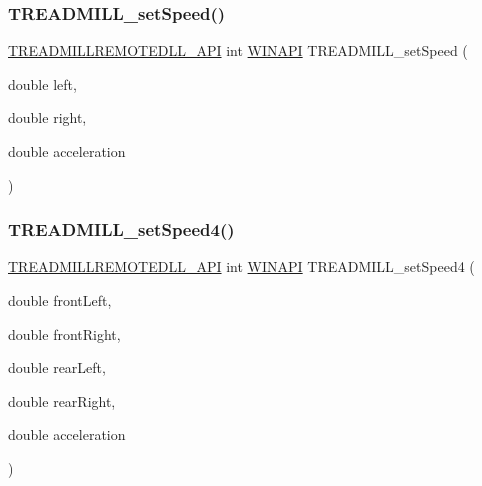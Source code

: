 \subsubsection{\texorpdfstring{T\+R\+E\+A\+D\+M\+I\+L\+L\+\_\+set\+Speed()}{TREADMILL\_setSpeed()}}
{\footnotesize\ttfamily \hyperlink{treadmill-remote_8h_a227455497d4d32bfe49f1f795b27c6cc}{T\+R\+E\+A\+D\+M\+I\+L\+L\+R\+E\+M\+O\+T\+E\+D\+L\+L\+\_\+\+A\+PI} int \hyperlink{treadmill-remote_8h_a9aa60e1ead64be77ad551e745cbfd4d3}{W\+I\+N\+A\+PI} T\+R\+E\+A\+D\+M\+I\+L\+L\+\_\+set\+Speed (\begin{DoxyParamCaption}\item[{double}]{left,  }\item[{double}]{right,  }\item[{double}]{acceleration }\end{DoxyParamCaption})}

\mbox{\label{treadmill-remote_8h_a677a8f38324cc71d8f5684f925719681}} 
\subsubsection{\texorpdfstring{T\+R\+E\+A\+D\+M\+I\+L\+L\+\_\+set\+Speed4()}{TREADMILL\_setSpeed4()}}
{\footnotesize\ttfamily \hyperlink{treadmill-remote_8h_a227455497d4d32bfe49f1f795b27c6cc}{T\+R\+E\+A\+D\+M\+I\+L\+L\+R\+E\+M\+O\+T\+E\+D\+L\+L\+\_\+\+A\+PI} int \hyperlink{treadmill-remote_8h_a9aa60e1ead64be77ad551e745cbfd4d3}{W\+I\+N\+A\+PI} T\+R\+E\+A\+D\+M\+I\+L\+L\+\_\+set\+Speed4 (\begin{DoxyParamCaption}\item[{double}]{front\+Left,  }\item[{double}]{front\+Right,  }\item[{double}]{rear\+Left,  }\item[{double}]{rear\+Right,  }\item[{double}]{acceleration }\end{DoxyParamCaption})}

